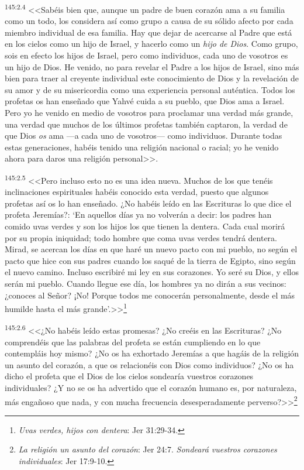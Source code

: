\par 
\textsuperscript{145:2.4} <<Sabéis bien que, aunque un padre de buen corazón ama a su familia como un todo, los considera así como grupo a causa de su sólido afecto por cada miembro individual de esa familia. Hay que dejar de acercarse al Padre que está en los cielos como un hijo de Israel, y hacerlo como un \textit{hijo de Dios}. Como grupo, sois en efecto los hijos de Israel, pero como individuos, cada uno de vosotros es un hijo de Dios. He venido, no para revelar el Padre a los hijos de Israel, sino más bien para traer al creyente individual este conocimiento de Dios y la revelación de su amor y de su misericordia como una experiencia personal auténtica. Todos los profetas os han enseñado que Yahvé cuida a su pueblo, que Dios ama a Israel. Pero yo he venido en medio de vosotros para proclamar una verdad más grande, una verdad que muchos de los últimos profetas también captaron, la verdad de que Dios \textit{os} ama ---a cada uno de vosotros--- como individuos. Durante todas estas generaciones, habéis tenido una religión nacional o racial; yo he venido ahora para daros una religión personal>>.

\par 
\textsuperscript{145:2.5} <<Pero incluso esto no es una idea nueva. Muchos de los que tenéis inclinaciones espirituales habéis conocido esta verdad, puesto que algunos profetas así os lo han enseñado. ¿No habéis leído en las Escrituras lo que dice el profeta Jeremías?: `En aquellos días ya no volverán a decir: los padres han comido uvas verdes y son los hijos los que tienen la dentera. Cada cual morirá por su propia iniquidad; todo hombre que coma uvas verdes tendrá dentera. Mirad, se acercan los días en que haré un nuevo pacto con mi pueblo, no según el pacto que hice con sus padres cuando los saqué de la tierra de Egipto, sino según el nuevo camino. Incluso escribiré mi ley en sus corazones. Yo seré su Dios, y ellos serán mi pueblo. Cuando llegue ese día, los hombres ya no dirán a sus vecinos: ¿conoces al Señor? ¡No! Porque todos me conocerán personalmente, desde el más humilde hasta el más grande'.>>\footnote{\textit{Uvas verdes, hijos con dentera}: Jer 31:29-34.}

\par 
\textsuperscript{145:2.6} <<¿No habéis leído estas promesas? ¿No creéis en las Escrituras? ¿No comprendéis que las palabras del profeta se están cumpliendo en lo que contempláis hoy mismo? ¿No os ha exhortado Jeremías a que hagáis de la religión un asunto del corazón, a que os relacionéis con Dios como individuos? ¿No os ha dicho el profeta que el Dios de los cielos sondearía vuestros corazones individuales? ¿Y no se os ha advertido que el corazón humano es, por naturaleza, más engañoso que nada, y con mucha frecuencia desesperadamente perverso?>>\footnote{\textit{La religión un asunto del corazón}: Jer 24:7. \textit{Sondeará vuestros corazones individuales}: Jer 17:9-10.}

